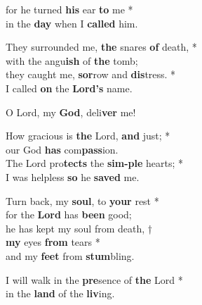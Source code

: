for he turned \textbf{his} ear \textbf{to} me *\\
in the \textbf{day} when I \textbf{called} him.

They surrounded me, \textbf{the} snares \textbf{of} death, *\\
with the angu\textbf{ish} of \textbf{the} tomb;\\
they caught me, \textbf{sor}row and \textbf{dis}tress. *\\
I called \textbf{on} the \textbf{Lord's} name.

O Lord, my \textbf{God}, deli\textbf{ver} me!

How gracious is \textbf{the} Lord, \textbf{and} just; *\\
our God \textbf{has} com\textbf{pass}ion.\\
The Lord pro\textbf{tects} the \textbf{sim-ple} hearts; *\\
I was helpless \textbf{so} he \textbf{saved} me.

Turn back, my \textbf{soul}, to \textbf{your} rest *\\
for the \textbf{Lord} has \textbf{been} good;\\
he has kept my soul from death, †\\
\textbf{my} eyes \textbf{from} tears *\\
and my \textbf{feet} from \textbf{stum}bling.

I will walk in the \textbf{pre}sence of \textbf{the} Lord *\\
in the \textbf{land} of the \textbf{liv}ing.